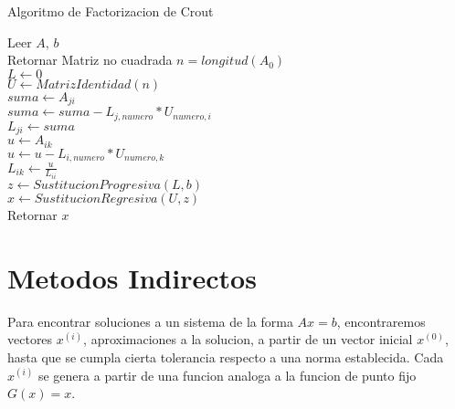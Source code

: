 \documentclass[12pt]{article}
\begin{document}
        \begin{algorithm}[H]
            \caption{Algoritmo de Factorizacion de Crout}
            Leer $A$, $b$\\
            {
                Retornar Matriz no cuadrada
            }
            {
                $n = longitud(A_{0})$\\ 
                $L \leftarrow 0$\\
                $U \leftarrow MatrizIdentidad(n)$\\
                {
                    {
                        $suma \leftarrow A_{ji}$\\
                        {
                            $suma \leftarrow suma - L_{j, numero} * U_{numero, i}$\\
                        }
                        $L_{ji} \leftarrow suma$\\
                    }
                    {
                        $u \leftarrow A_{ik}$\\
                        {
                            $u \leftarrow u - L_{i, numero} * U_{numero, k}$\\
                        }
                        $L_{ik} \leftarrow \frac{u}{L_{ii}}$\\
                    }
                }
                $z \leftarrow SustitucionProgresiva(L, b)$\\
                $x \leftarrow SustitucionRegresiva(U, z)$\\
                Retornar $x$
            }

        \end{algorithm}

        \section{Metodos Indirectos}
        Para encontrar soluciones a un sistema de la forma $Ax = b$, encontraremos vectores $x^{(i)}$, aproximaciones a la solucion, a partir de un vector inicial $x^{(0)}$, hasta que se cumpla cierta tolerancia respecto a una norma establecida. Cada $x^{(i)}$ se genera a partir de una funcion analoga a la funcion de punto fijo $G(x) = x$. 
\end{document}
